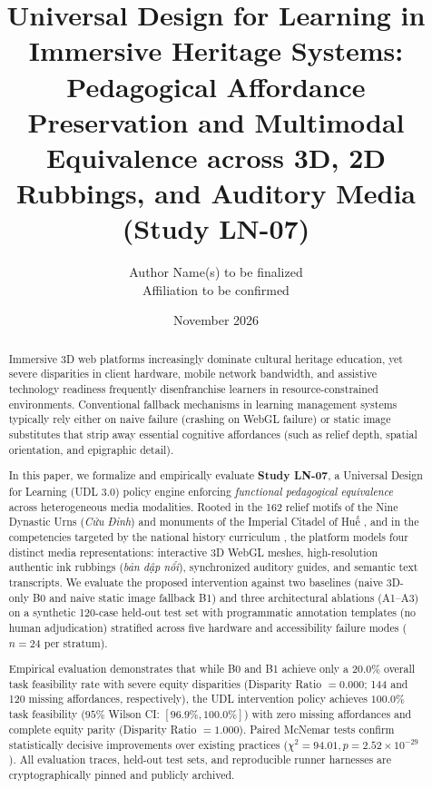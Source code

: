 \documentclass[11pt,a4paper]{article}
\title{\textbf{Universal Design for Learning in Immersive Heritage Systems:}\\
\large Pedagogical Affordance Preservation and Multimodal Equivalence across 3D, 2D Rubbings, and Auditory Media (Study LN-07)}
\author{
  Author Name(s) to be finalized \\
  \small Affiliation to be confirmed
}
\date{November 2026}
\begin{document}
\maketitle

\begin{abstract}
Immersive 3D web platforms increasingly dominate cultural heritage education, yet severe disparities in client hardware, mobile network bandwidth, and assistive technology readiness frequently disenfranchise learners in resource-constrained environments. Conventional fallback mechanisms in learning management systems typically rely either on naive failure (crashing on WebGL failure) or static image substitutes that strip away essential cognitive affordances (such as relief depth, spatial orientation, and epigraphic detail). 

In this paper, we formalize and empirically evaluate \textbf{Study LN-07}, a Universal Design for Learning (UDL 3.0) policy engine enforcing \textit{functional pedagogical equivalence} across heterogeneous media modalities. Rooted in the 162 relief motifs of the Nine Dynastic Urns (\textit{Cửu Đỉnh}) and monuments of the Imperial Citadel of Huế \cite{unesco2024cuudinh}, and in the competencies targeted by the national history curriculum \cite{moet2018gdpt}, the platform models four distinct media representations: interactive 3D WebGL meshes, high-resolution authentic ink rubbings (\textit{bản dập nổi}), synchronized auditory guides, and semantic text transcripts. We evaluate the proposed intervention against two baselines (naive 3D-only B0 and naive static image fallback B1) and three architectural ablations (A1--A3) on a synthetic 120-case held-out test set with programmatic annotation templates (no human adjudication) stratified across five hardware and accessibility failure modes ($n = 24$ per stratum). 

Empirical evaluation demonstrates that while B0 and B1 achieve only a $20.0\%$ overall task feasibility rate with severe equity disparities (Disparity Ratio $= 0.000$; 144 and 120 missing affordances, respectively), the UDL intervention policy achieves $100.0\%$ task feasibility ($95\%$ Wilson CI: $[96.9\%, 100.0\%]$) with zero missing affordances and complete equity parity (Disparity Ratio $= 1.000$). Paired McNemar tests confirm statistically decisive improvements over existing practices ($\chi^2 = 94.01, p = 2.52 \times 10^{-29}$). All evaluation traces, held-out test sets, and reproducible runner harnesses are cryptographically pinned and publicly archived.
\end{abstract}
\end{document}
